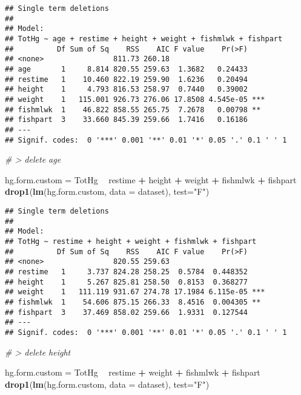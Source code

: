 \documentclass[12pt,]{article}
\newenvironment{Shaded}{\begin{snugshade}}{\end{snugshade}}
\newcommand{\KeywordTok}[1]{\textcolor[rgb]{0.13,0.29,0.53}{\textbf{#1}}}
\newcommand{\DataTypeTok}[1]{\textcolor[rgb]{0.13,0.29,0.53}{#1}}
\newcommand{\StringTok}[1]{\textcolor[rgb]{0.31,0.60,0.02}{#1}}
\newcommand{\CommentTok}[1]{\textcolor[rgb]{0.56,0.35,0.01}{\textit{#1}}}
\newcommand{\OperatorTok}[1]{\textcolor[rgb]{0.81,0.36,0.00}{\textbf{#1}}}
\newcommand{\NormalTok}[1]{#1}
\begin{document}
\begin{verbatim}
## Single term deletions
## 
## Model:
## TotHg ~ age + restime + height + weight + fishmlwk + fishpart
##          Df Sum of Sq    RSS    AIC F value    Pr(>F)    
## <none>                811.73 260.18                      
## age       1     8.814 820.55 259.63  1.3682   0.24433    
## restime   1    10.460 822.19 259.90  1.6236   0.20494    
## height    1     4.793 816.53 258.97  0.7440   0.39002    
## weight    1   115.001 926.73 276.06 17.8508 4.545e-05 ***
## fishmlwk  1    46.822 858.55 265.75  7.2678   0.00798 ** 
## fishpart  3    33.660 845.39 259.66  1.7416   0.16186    
## ---
## Signif. codes:  0 '***' 0.001 '**' 0.01 '*' 0.05 '.' 0.1 ' ' 1
\end{verbatim}

\begin{Shaded}
\begin{Highlighting}[]
\CommentTok{# > delete age}

\NormalTok{hg.form.custom =}\StringTok{ }\NormalTok{TotHg }\OperatorTok{~}\StringTok{ }\NormalTok{restime }\OperatorTok{+}\StringTok{ }\NormalTok{height }\OperatorTok{+}\StringTok{ }\NormalTok{weight }\OperatorTok{+}\StringTok{ }\NormalTok{fishmlwk }\OperatorTok{+}\StringTok{ }\NormalTok{fishpart}
\KeywordTok{drop1}\NormalTok{(}\KeywordTok{lm}\NormalTok{(hg.form.custom, }\DataTypeTok{data =}\NormalTok{ dataset), }\DataTypeTok{test=}\StringTok{"F"}\NormalTok{)}
\end{Highlighting}
\end{Shaded}

\begin{verbatim}
## Single term deletions
## 
## Model:
## TotHg ~ restime + height + weight + fishmlwk + fishpart
##          Df Sum of Sq    RSS    AIC F value    Pr(>F)    
## <none>                820.55 259.63                      
## restime   1     3.737 824.28 258.25  0.5784  0.448352    
## height    1     5.267 825.81 258.50  0.8153  0.368277    
## weight    1   111.119 931.67 274.78 17.1984 6.115e-05 ***
## fishmlwk  1    54.606 875.15 266.33  8.4516  0.004305 ** 
## fishpart  3    37.469 858.02 259.66  1.9331  0.127544    
## ---
## Signif. codes:  0 '***' 0.001 '**' 0.01 '*' 0.05 '.' 0.1 ' ' 1
\end{verbatim}

\begin{Shaded}
\begin{Highlighting}[]
\CommentTok{# > delete height}

\NormalTok{hg.form.custom =}\StringTok{ }\NormalTok{TotHg }\OperatorTok{~}\StringTok{ }\NormalTok{restime }\OperatorTok{+}\StringTok{ }\NormalTok{weight }\OperatorTok{+}\StringTok{ }\NormalTok{fishmlwk }\OperatorTok{+}\StringTok{ }\NormalTok{fishpart}
\KeywordTok{drop1}\NormalTok{(}\KeywordTok{lm}\NormalTok{(hg.form.custom, }\DataTypeTok{data =}\NormalTok{ dataset), }\DataTypeTok{test=}\StringTok{"F"}\NormalTok{)}
\end{Highlighting}
\end{Shaded}
\end{document}
